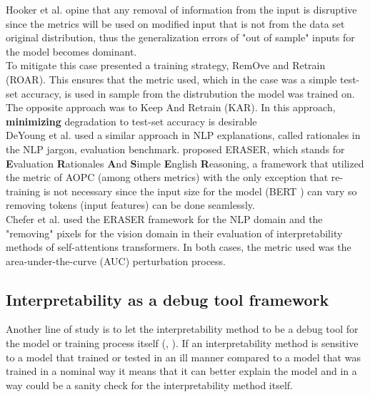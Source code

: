 \documentclass[12pt]{report}
\begin{document}
Hooker et al.  \cite{https://doi.org/10.48550/arxiv.1806.10758} opine that any removal of information from the input is disruptive since the metrics will be used on modified input that is not from the data set original distribution, thus the generalization errors of "out of sample" inputs for the model becomes dominant. \\

To mitigate this case \cite{https://doi.org/10.48550/arxiv.1806.10758} presented a training strategy, RemOve and Retrain (ROAR). This ensures that the metric used, which in the case was a simple test-set accuracy, is used in sample from the distrubution the model was trained on. The opposite approach was to Keep And Retrain (KAR). In this approach, \textbf{minimizing} degradation to test-set accuracy is desirable\\

DeYoung et al. \cite{DBLP:journals/corr/abs-1911-03429} used a similar approach in NLP explanations, called rationales in the NLP jargon, evaluation benchmark. \cite{DBLP:journals/corr/abs-1911-03429} proposed ERASER, which stands for \textbf{E}valuation \textbf{R}ationales \textbf{A}nd \textbf{S}imple \textbf{E}nglish \textbf{R}easoning, a framework that utilized the metric of AOPC (among others metrics) with the only exception that re-training is not necessary since the input size for the model (BERT \cite{devlin-etal-2019-bert}) can vary so removing tokens (input features) can be done seamlessly.  \\

Chefer et al. \cite{DBLP:journals/corr/abs-2012-09838} used the ERASER framework for the NLP domain and the "removing" pixels for the vision domain in their evaluation of interpretability methods of self-attentions transformers. In both cases, the metric used was the area-under-the-curve (AUC) perturbation process. 

\newpage
\subsection{Interpretability as a debug tool framework}

Another line of study is to let the interpretability method to be a debug tool for the model or training process itself (\cite{https://doi.org/10.48550/arxiv.1810.03292}, \cite{DBLP:journals/corr/abs-2011-05429}). If an interpretability method is sensitive to a model that trained or tested in an ill manner compared to a model that was trained in a nominal way it means that it can better explain the model and in a way could be a sanity check for the interpretability method itself. \\
\end{document}
